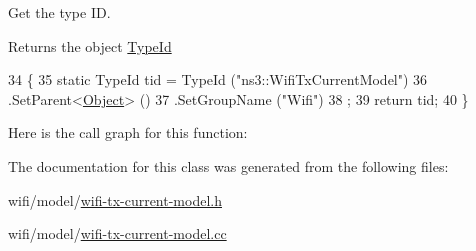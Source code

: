 Get the type ID. 

\begin{DoxyReturn}{Returns}
the object \hyperlink{classns3_1_1TypeId}{Type\+Id} 
\end{DoxyReturn}

\begin{DoxyCode}
34 \{
35   \textcolor{keyword}{static} TypeId tid = TypeId (\textcolor{stringliteral}{"ns3::WifiTxCurrentModel"})
36     .SetParent<\hyperlink{classns3_1_1Object_a40860402e64d8008fb42329df7097cdb}{Object}> ()
37     .SetGroupName (\textcolor{stringliteral}{"Wifi"})
38   ;
39   \textcolor{keywordflow}{return} tid;
40 \}
\end{DoxyCode}


Here is the call graph for this function\+:




The documentation for this class was generated from the following files\+:\begin{DoxyCompactItemize}
\item 
wifi/model/\hyperlink{wifi-tx-current-model_8h}{wifi-\/tx-\/current-\/model.\+h}\item 
wifi/model/\hyperlink{wifi-tx-current-model_8cc}{wifi-\/tx-\/current-\/model.\+cc}\end{DoxyCompactItemize}
